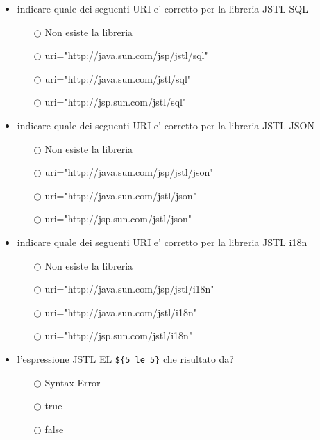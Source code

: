\documentclass[10pt,twocolumn]{article}
\begin{document}
\begin{itemize}
    \item indicare quale dei seguenti URI e' corretto per la libreria JSTL SQL
          \begin{itemize}
              \item[$\bigcirc$] Non esiste la libreria
              \item[$\bigcirc$] uri="http://java.sun.com/jsp/jstl/sql"
              \item[$\bigcirc$] uri="http://java.sun.com/jstl/sql"
              \item[$\bigcirc$] uri="http://jsp.sun.com/jstl/sql"
          \end{itemize}
\end{itemize}
\begin{itemize}
    \item indicare quale dei seguenti URI e' corretto per la libreria JSTL JSON
          \begin{itemize}
              \item[$\bigcirc$] Non esiste la libreria
              \item[$\bigcirc$] uri="http://java.sun.com/jsp/jstl/json"
              \item[$\bigcirc$] uri="http://java.sun.com/jstl/json"
              \item[$\bigcirc$] uri="http://jsp.sun.com/jstl/json"
          \end{itemize}
\end{itemize}
\begin{itemize}
    \item indicare quale dei seguenti URI e' corretto per la libreria JSTL i18n
          \begin{itemize}
              \item[$\bigcirc$] Non esiste la libreria
              \item[$\bigcirc$] uri="http://java.sun.com/jsp/jstl/i18n"
              \item[$\bigcirc$] uri="http://java.sun.com/jstl/i18n"
              \item[$\bigcirc$] uri="http://jsp.sun.com/jstl/i18n"
          \end{itemize}
\end{itemize}
\begin{itemize}
    \item l'espressione JSTL EL \verb=${5 le 5}= che risultato da?
          \begin{itemize}
              \item[$\bigcirc$] Syntax Error
              \item[$\bigcirc$] true
              \item[$\bigcirc$] false
          \end{itemize}
\end{itemize}
\end{document}
